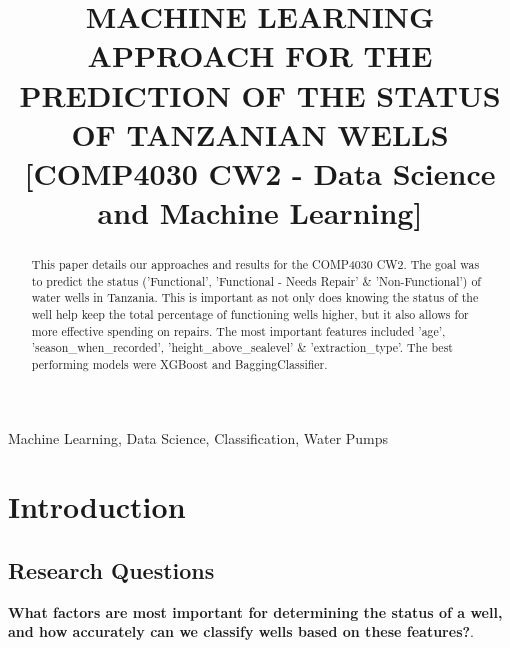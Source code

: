\documentclass[conference]{IEEEtran}
\begin{document}
\title{MACHINE LEARNING APPROACH FOR THE PREDICTION OF THE STATUS OF TANZANIAN WELLS [COMP4030 CW2 - Data Science and Machine Learning]
}

\author{
\and
{}
}

\maketitle

\begin{abstract}
  This paper details our approaches and results for the COMP4030 CW2. The goal was to predict the status ('Functional', 'Functional - Needs Repair' \& 'Non-Functional') of water wells in Tanzania. This is important as not only does knowing the status of the well help keep the total percentage of functioning wells higher, but it also allows for more effective spending on repairs. The most important features included 'age', 'season\_when\_recorded', 'height\_above\_sealevel' \& 'extraction\_type'. The best performing models were XGBoost and BaggingClassifier.
\end{abstract}

\begin{IEEEkeywords}
  Machine Learning, Data Science, Classification, Water Pumps
\end{IEEEkeywords}

\section{Introduction}

\subsection{Research Questions}

\textbf{What factors are most important for determining the status of a well, and how accurately can we classify wells based on these features?}. 
\end{document}

